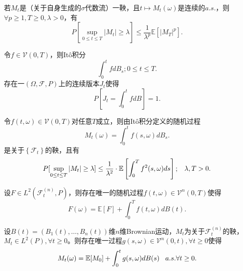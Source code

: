 \documentclass[oneside]{sysuthesis}
\begin{document}
\begin{theorem}\label{theo:Doob_martingale_inequaty}
	若$M_t$是（关于自身生成的$\sigma$代数流）一鞅，且$t\mapsto M_t(\omega)$是连续的$a.s.$，则$\forall p\ge 1,T\ge 0,\lambda>0$，有
	\[
	P[\sup_{0\le t\le T}\left\vert M_t\right\vert\ge\lambda]\le\frac{1}{\lambda^p}\mathbb{E}[\left\vert M_T\right\vert^p].
	\]
\end{theorem}

\begin{theorem}[It\^o积分连续版本定理]\label{theo:Ito_int_continuity}
	令$f\in\mathcal{V}(0,T)$，则It\^o积分
	\[
	\int_{0}^{t}fdB_s;0\le t\le T.
	\]
	存在一$(\Omega,\mathcal{F},P)$上的连续版本$J_t$使得
	\[
	P\left[J_t=\int_{0}^{t}fdB\right]=1.
	\]
\end{theorem}

\begin{theorem}[It\^o积分的鞅性]\label{theo:Ito_int_martingale}
	令$f(t,\omega)\in\mathcal{V}(0,T)$对任意$T$成立，则由It\^o积分定义的随机过程
	\[
	M_t(\omega)=\int_{0}^{t}f(s,\omega)dB_s.
	\]
	是关于$\left\{\mathcal{F}_t\right\}$的鞅，且有
	\[
	P[\sup_{0\le t\le T}\left\vert M_t\right\vert\ge\lambda]\le\frac{1}{\lambda^2}\cdot \mathbb{E}\left[\int_{0}^{T}f^2(s,\omega)ds\right];\hspace{0.3cm}\lambda,T>0.
	\]
\end{theorem}

\begin{theorem}[It\^o表示定理]\label{theo:Ito_represent}
	设$F\in L^2(\mathcal{F}_t^{(n)},P)$，则存在唯一的随机过程$f(t,\omega)\in\mathcal{V}^n(0,T)$使得
	\[
	F(\omega)=\mathbb{E}[F]+\int_{0}^{T}f(t,\omega)dB(t).
	\]
\end{theorem}

\begin{theorem}[鞅表示定理]\label{theo:martingale_represent}
	设$B(t)=(B_1(t),\ldots,B_n(t))$维$n$维Brownian运动，$M_t$为关于$\mathcal{F}_t^{(n)}$的鞅，$M_t\in L^2(P),\forall t\ge 0$。则存在唯一过程$g(s,\omega)\in\mathcal{V}^n(0,t),\forall t\ge 0$使得
	\[
	M_t(\omega)=\mathbb{E}[M_0]+\int_{0}^{t}g(s,\omega)dB(s)\hspace{0.3cm}a.s.\forall t\ge 0.
	\]
\end{theorem}
\end{document}
